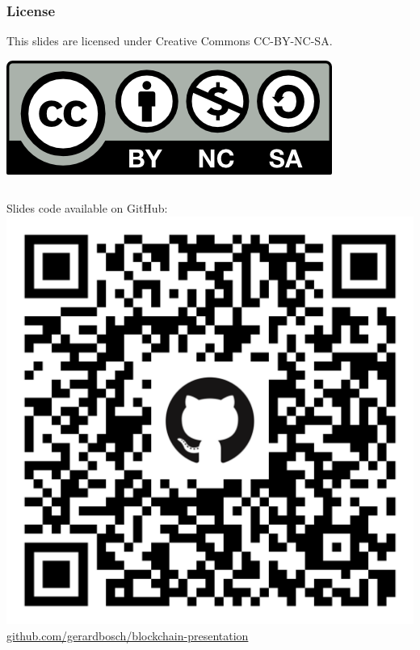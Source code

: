 \documentclass[notitlepage, usenames,dvipsnames]{beamer}
\begin{document}
    \begin{frame}
        \frametitle{License}

        This slides are licensed under Creative Commons CC-BY-NC-SA.

        \begin{center}\includegraphics[scale=0.6]{../img/cc-by-nc-sa.png}\end{center}
        
        \vspace{2ex}
        \begin{columns}
            \centering
            Slides code available on GitHub: \\[1ex]
            \includegraphics[scale=0.06]{../img/github-repo.png} \\
            \tiny \href{https://github.com/gerardbosch/blockchain-presentation}{github.com/gerardbosch/blockchain-presentation}
        

\end{columns}
\end{frame}
\end{document}
